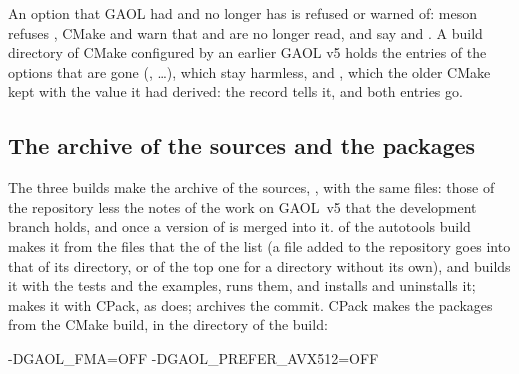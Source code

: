 \begin{Rem}
An option that GAOL had and no longer has is refused or warned of: meson
refuses , CMake and  warn that
 and  are no longer read, and
say  and . A build directory of
CMake configured by an earlier GAOL v5 holds the entries of the options that
are gone (, \ldots), which stay
harmless, and , which the older CMake kept with
the value it had derived: the record 
tells it, and both entries go.
\end{Rem}

\subsection{The archive of the sources and the packages}\label{sec:packages}
%

The three builds make the archive of the sources,
, with the same files: those of the
repository less the notes of the work on GAOL~v5 that the development branch
 holds, and  once a version of  is merged
into it.\newinvfive{}  of the autotools
build makes it from the files that the  of the
 list (a file added to the repository goes into that of its
directory, or of the top one for a directory without its own), and
 builds it with the tests and the examples, runs them, and
installs and uninstalls it;  makes it
with CPack, as  does;  archives the commit. CPack makes the packages from the CMake
build, in the directory of the build:

\begin{cmdshell}
        -DGAOL_FMA=OFF -DGAOL_PREFER_AVX512=OFF
\end{cmdshell}


